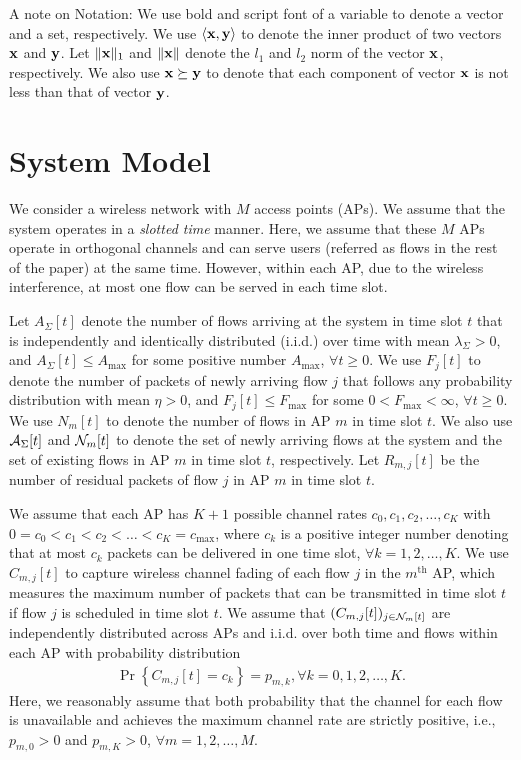 \documentclass[10pt, conference, letterpaper]{IEEEtran} %
\begin{document}
A note on Notation: We use bold and script font of a variable to denote
a vector and a set, respectively.
We use $\langle\mathbf{x},\mathbf{y}\rangle$ to denote the inner product
of two vectors $\mathbf{x}$ and $\mathbf{y}$. Let $\|\mathbf{x}\|_{1}$ and $\|\mathbf{x}\|$ denote the $l_1$ and $l_2$ norm of the vector $\mathbf{x}$, respectively. We also use $\mathbf{x}\succeq\mathbf{y}$ to denote that each component of vector $\mathbf{x}$ is not less than that of vector $\mathbf{y}$.

\section{System Model}
\label{sec:model}
We consider a wireless network with $M$ access points (APs). We assume that the system operates in a \emph{slotted time} manner. Here, we assume that these $M$ APs operate in orthogonal channels and can serve users (referred as flows in the rest of the paper) at the same time. However, within each AP, due to the wireless interference, at most one flow can be served in each time slot. 

Let $A_{\Sigma}[t]$ denote the number of flows arriving at the system in time slot $t$ that is independently and identically distributed (i.i.d.) over time with mean $\lambda_{\Sigma}>0$, and $A_{\Sigma}[t]\leq A_{\max}$ for some positive number $A_{\max}$, $\forall t\geq0$. We use $F_{j}[t]$ to denote the number of packets of newly arriving flow $j$ that follows any probability distribution with mean $\eta>0$, and $F_{j}[t]\leq F_{\max}$ for some $0<F_{\max}<\infty$, $\forall t\geq0$. We use $N_{m}[t]$ to denote the number of flows in AP $m$ in time slot $t$. We also use $\mathcal{A}_{\Sigma}[t]$ and $\mathcal{N}_{m}[t]$ to denote the set of newly arriving flows at the system and the set of existing flows in AP $m$ in time slot $t$, respectively. Let $R_{m,j}[t]$ be the number of residual packets of flow $j$ in AP $m$ in time slot $t$. 

We assume that each AP has $K+1$ possible channel rates $c_0, c_1,c_2,\ldots,c_K$ with $0=c_0<c_1<c_2<\ldots<c_K=c_{\max}$, where $c_k$ is a positive integer number denoting that at most $c_k$ packets can be delivered in one time slot, $\forall k=1,2,\ldots,K$. We use $C_{m,j}[t]$ to capture wireless channel fading of each flow $j$ in the $m^{\text{th}}$ AP, which measures the maximum number of packets that can be transmitted in time slot $t$ if flow $j$ is scheduled in time slot $t$. We assume that $(C_{m,j}[t])_{j\in\mathcal{N}_{m}[t]}$ are independently distributed across APs and
i.i.d. over both time and flows within each AP with probability distribution
\begin{align}
\Pr\left\{C_{m,j}[t]=c_k\right\}=p_{m,k}, \forall k=0,1,2,\ldots,K.
\end{align}
Here, we reasonably assume that both probability that the channel for each flow is unavailable and achieves the maximum channel rate are strictly positive, i.e., $p_{m,0}>0$ and $p_{m,K}>0$, $\forall m=1,2,\ldots,M$.
\end{document}
